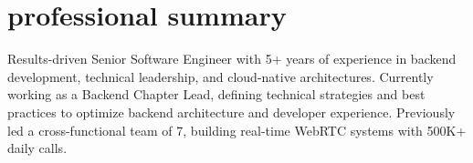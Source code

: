 \documentclass[a4paper]{article}
\begin{document}
\hspace{20pt}
\begin{minipage}[t]{0.65\textwidth}
  \preparetopsec
  \section{professional summary}
    \begin{justify}
      \begin{footnotesize}
Results-driven Senior Software Engineer with 5+ years of experience in backend 
development, technical leadership, and cloud-native architectures. Currently working
as a Backend Chapter Lead, defining technical strategies and best practices 
to optimize backend architecture and developer experience. Previously led a cross-functional 
team of 7, building real-time WebRTC systems with 500K+ daily calls.
      \end{footnotesize}
    \end{justify}
  \preparenormalsec

\end{minipage}
\end{document}
